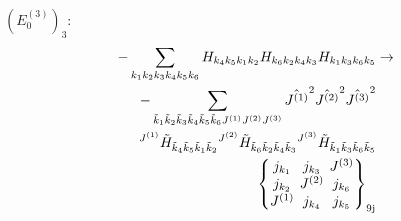 \documentclass[11pt]{article}
\newcommand{\ninej}[9]{\begingroup\setlength{\arraycolsep}{0.2em}\begin{Bmatrix} #1 & #2 & #3 \\ #4 & #5 & #6 \\ #7 & #8 & #9 \end{Bmatrix}_{\text{9j}}\endgroup}
\begin{document}
$\left({E^{(3)}_{0}}\right)_{3}$:
\begin{align}
-\sum_{{k}_{1}{k}_{2}{k}_{3}{k}_{4}{k}_{5}{k}_{6}}{H}_{{k}_{4}{k}_{5}{k}_{1}{k}_{2}}{H}_{{k}_{6}{k}_{2}{k}_{4}{k}_{3}}{H}_{{k}_{1}{k}_{3}{k}_{6}{k}_{5}}&\rightarrow \notag \\-\sum_{\tilde{k}_{1}\tilde{k}_{2}\tilde{k}_{3}\tilde{k}_{4}\tilde{k}_{5}\tilde{k}_{6}J^{(1)}J^{(2)}J^{(3)}}\hat{J^{(1)}}^{2}\hat{J^{(2)}}^{2}\hat{J^{(3)}}^{2}& \notag \\{}^{J^{(1)}}\tilde{H}_{\tilde{k}_{4}\tilde{k}_{5}\tilde{k}_{1}\tilde{k}_{2}}{}^{J^{(2)}}\tilde{H}_{\tilde{k}_{6}\tilde{k}_{2}\tilde{k}_{4}\tilde{k}_{3}}{}^{J^{(3)}}\tilde{H}_{\tilde{k}_{1}\tilde{k}_{3}\tilde{k}_{6}\tilde{k}_{5}}& \notag \\\ninej{j_{{k}_{1}}}{j_{{k}_{3}}}{J^{(3)}}{j_{{k}_{2}}}{J^{(2)}}{j_{{k}_{6}}}{J^{(1)}}{j_{{k}_{4}}}{j_{{k}_{5}}}
\end{align}
\end{document}
